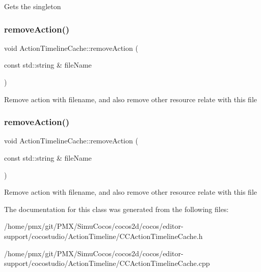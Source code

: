 Gets the singleton \mbox{\label{classActionTimelineCache_ac4308862e347ec5cb1459c29f8b8d012}} 
\subsubsection{\texorpdfstring{remove\+Action()}{removeAction()}\hspace{0.1cm}{\footnotesize\ttfamily [1/2]}}
{\footnotesize\ttfamily void Action\+Timeline\+Cache\+::remove\+Action (\begin{DoxyParamCaption}\item[{const std\+::string \&}]{file\+Name }\end{DoxyParamCaption})}

Remove action with filename, and also remove other resource relate with this file \mbox{\label{classActionTimelineCache_ac4308862e347ec5cb1459c29f8b8d012}} 
\subsubsection{\texorpdfstring{remove\+Action()}{removeAction()}\hspace{0.1cm}{\footnotesize\ttfamily [2/2]}}
{\footnotesize\ttfamily void Action\+Timeline\+Cache\+::remove\+Action (\begin{DoxyParamCaption}\item[{const std\+::string \&}]{file\+Name }\end{DoxyParamCaption})}

Remove action with filename, and also remove other resource relate with this file 

The documentation for this class was generated from the following files\+:\begin{DoxyCompactItemize}
\item 
/home/pmx/git/\+P\+M\+X/\+Simu\+Cocos/cocos2d/cocos/editor-\/support/cocostudio/\+Action\+Timeline/C\+C\+Action\+Timeline\+Cache.\+h\item 
/home/pmx/git/\+P\+M\+X/\+Simu\+Cocos/cocos2d/cocos/editor-\/support/cocostudio/\+Action\+Timeline/C\+C\+Action\+Timeline\+Cache.\+cpp\end{DoxyCompactItemize}
